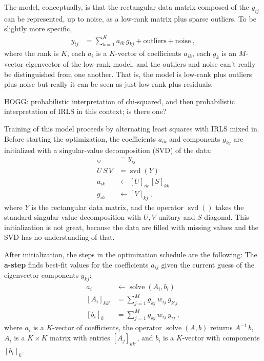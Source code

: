 \documentclass{article}
\DeclareMathOperator{\solve}{solve}
\DeclareMathOperator{\svd}{svd}
\begin{document}
The model, conceptually, is that the rectangular data matrix composed of the $y_{ij}$ can be represented, up to noise, as a low-rank matrix plus sparse outliers.
To be slightly more specific,
\begin{align}
    y_{ij} &= \sum_{k=1}^K a_{ik}\,g_{kj} + \text{outliers} + \text{noise} ~,\label{eq:model}
\end{align}
where the rank is $K$,
each $a_i$ is a $K$-vector of coefficients $a_{ik}$,
each $g_k$ is an $M$-vector eigenvector of the low-rank model,
and the outliers and noise can't really be distinguished from one another.
That is, the model is low-rank plus outliers plus noise but really it can be seen as just low-rank plus residuals.

HOGG: probabilistic interpretation of chi-squared, and then probabilistic interpretation of IRLS in this context; is there one?

Training of this model proceeds by alternating least squares with IRLS mixed in.
Before starting the optimization, the coefficients $a_{ik}$ and components $g_{kj}$ are initialized with a singular-value decomposition (SVD) of the data:
\begin{align}
    [Y]_{ij} &= y_{ij} \\
    U\,S\,V &= \svd(Y) \\
    a_{ik} &\leftarrow [U]_{ik}\,[S]_{kk} \\
    g_{ik} &\leftarrow [V]_{kj} ~,
\end{align}
where $Y$ is the rectangular data matrix,
and the operator $\svd()$ takes the standard singular-value decomposition with $U, V$ unitary and $S$ diagonal.
This initialization is not great, because the data are filled with missing values and the SVD has no understanding of that.

After initialization, the steps in the optimization schedule are the following:
The \textbf{a-step} finds best-fit values for the coefficients $a_{ij}$ given the current guess of the eigenvector components $g_{kj}$:
\begin{align}
    a_i &\leftarrow \solve(A_i, b_i) \\ \label{eq:a-step}
    [A_i]_{kk'} &= \sum_{j=1}^M g_{kj}\,w_{ij}\,g_{k'j} \\
    [b_i]_k     &= \sum_{j=1}^M g_{kj}\,w_{ij}\,y_{ij} ~,
\end{align}
where $a_i$ is a $K$-vector of coefficients,
the operator $\solve(A, b)$ returns $A^{-1}\,b$,
$A_i$ is a $K\times K$ matrix with entries $[A_j]_{kk'}$,
and $b_i$ is a $K$-vector with components $[b_i]_k$.
\end{document}
